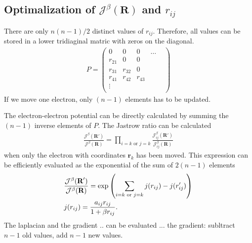 \documentclass[a4paper,10pt,twocolumn]{article} %
\newcommand{\ts}[1]{\textbf{#1}}
\begin{document}
\subsection{Optimalization of $\mathcal J^\beta(\ts R)$ and $r_{ij}$}%
There are only $n(n-1)/2$ distinct values of $r_{ij}$. Therefore, all values can be stored in a lower tridiaginal matric with zeros on the diagonal.
\begin{align}
	P = 
\left(
\begin{matrix}
	0 		& 0	 	&0 		&\dots	&\\
	r_{21}  & 0 	&0 		& &\\
	r_{31} 	& r_{32}&0 		& &\\
	r_{41} 	& r_{42}&r_{43} & &\\
	\vdots 	& 		& 		& &\\
\end{matrix}
\right)\label{eqP}
\end{align}
If we move one electron, only $(n-1)$ elements has to be updated. 

The electron-electron potential can be directly calculated by summing the $(n-1)$ inverse elements of $P$. The Jastrow ratio can be calculated
\begin{align}
	\frac{\mathcal J^\beta(\ts R')}{\mathcal J^\beta(\ts R)}
	= \prod_{i=k\text{ or }j=k} \frac{ \mathcal J_{ij}^\beta(\ts R') }{ \mathcal J_{ij}^\beta(\ts R)}
\end{align} 
when only the electron with coordinates $\ts r_k$ has been moved. This expression can be efficiently evaluated as the exponential of the sum of $2(n-1)$ elements
\begin{align}
	&\frac{\mathcal J^\beta(\ts R')}{\mathcal J^\beta(\ts R)}=
	\exp\left(\sum_{i=k\text{ or }j=k}  j(r_{ij})  - j(r'_{ij}) \right)\notag\\
	&j(r_{ij})=\frac {a_{ij}r_{ij}}{1+\beta r_{ij}}.
\end{align}
The laplacian and the gradient $..$ can be evaluated ...
the gradient: subltract $n-1$ old values, add $n-1$ new values.

\end{document}
